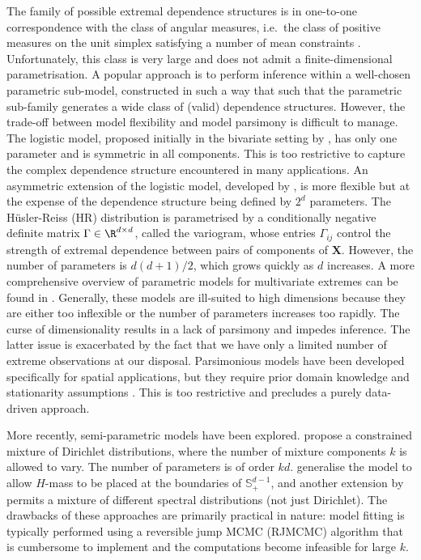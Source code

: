 \documentclass[en-GB, a4paper, nobind]{templates/bathreport}
\begin{document}
The family of possible extremal dependence structures is in one-to-one correspondence with the class of angular measures, i.e.~the class of positive measures on the unit simplex satisfying a number of mean constraints \autocite[Section 8.2.3]{beirlantStatisticsExtremesTheory2004}. Unfortunately, this class is very large and does not admit a finite-dimensional parametrisation. A popular approach is to perform inference within a well-chosen parametric sub-model, constructed in such a way that such that the parametric sub-family generates a wide class of (valid) dependence structures. However, the trade-off between model flexibility and model parsimony is difficult to manage. The logistic model, proposed initially in the bivariate setting by \textcite{gumbelBivariateExponentialDistributions1960}, has only one parameter and is symmetric in all components. This is too restrictive to capture the complex dependence structure encountered in many applications. An asymmetric extension of the logistic model, developed by \textcite{tawnBivariateExtremeValue1988}, is more flexible but at the expense of the dependence structure being defined by \(2^d\) parameters. The Hüsler-Reiss (HR) distribution \autocite{huslerMaximaNormalRandom1989} is parametrised by a conditionally negative definite matrix \(\Gamma\in\R^{d\times d}\), called the variogram, whose entries \(\Gamma_{ij}\) control the strength of extremal dependence between pairs of components of \(\bm{X}\). However, the number of parameters is \(d(d+1)/2\), which grows quickly as \(d\) increases. A more comprehensive overview of parametric models for multivariate extremes can be found in \textcite{gudendorfExtremeValueCopulas2010}. Generally, these models are ill-suited to high dimensions because they are either too inflexible or the number of parameters increases too rapidly. The curse of dimensionality results in a lack of parsimony and impedes inference. The latter issue is exacerbated by the fact that we have only a limited number of extreme observations at our disposal. Parsimonious models have been developed specifically for spatial applications, but they require prior domain knowledge and stationarity assumptions \autocite{wackernagelMultivariateGeostatisticsIntroduction1995}. This is too restrictive and precludes a purely data-driven approach.

More recently, semi-parametric models have been explored. \textcite{boldiMixtureModelMultivariate2007} propose a constrained mixture of Dirichlet distributions, where the number of mixture components \(k\) is allowed to vary. The number of parameters is of order \(kd\). \textcite{hansonBernsteinPolynomialAngular2017} generalise the model to allow \(H\)-mass to be placed at the boundaries of \(\mathbb{S}_+^{d-1}\), and another extension by \textcite{decarvalhoSpectralDensityRatio2014} permits a mixture of different spectral distributions (not just Dirichlet). The drawbacks of these approaches are primarily practical in nature: model fitting is typically performed using a reversible jump MCMC (RJMCMC) algorithm that is cumbersome to implement and the computations become infeasible for large \(k\).
\end{document}
